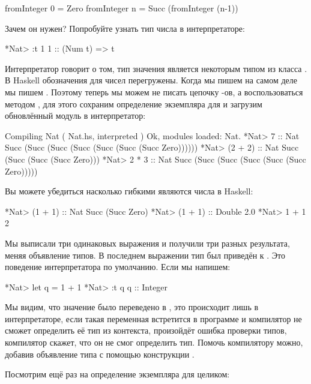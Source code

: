 \begin{code}
    fromInteger 0 = Zero
    fromInteger n = Succ (fromInteger (n-1))
\end{code}

Зачем он нужен? 
Попробуйте узнать тип числа  в интерпретаторе:

\begin{code}
*Nat> :t 1
1 :: (Num t) => t
\end{code}


Интерпретатор говорит о том, тип значения  является некоторым
типом из класса . В Haskell обозначения для чисел перегружены.
Когда мы пишем  на самом деле мы пишем .
Поэтому теперь мы можем не писать цепочку -ов, а воспользоваться 
методом , для этого сохраним определение экземпляра
для  и загрузим обновлённый модуль в интерпретатор: 

\begin{code}
[1 of 1] Compiling Nat              ( Nat.hs, interpreted )
Ok, modules loaded: Nat.
*Nat> 7 :: Nat
Succ (Succ (Succ (Succ (Succ (Succ (Succ Zero))))))
*Nat> (2 + 2) :: Nat
Succ (Succ (Succ (Succ Zero)))
*Nat> 2 * 3 :: Nat
Succ (Succ (Succ (Succ (Succ (Succ Zero)))))
\end{code}

Вы можете убедиться насколько гибкими являются числа в Haskell:

\begin{code}
*Nat> (1 + 1) :: Nat
Succ (Succ Zero)
*Nat> (1 + 1) :: Double
2.0
*Nat> 1 + 1
2
\end{code}


Мы выписали три одинаковых выражения и получили три разных 
результата, меняя объявление типов. В последнем выражении
тип был приведён к . Это поведение интерпретатора
по умолчанию. Если мы напишем:


\begin{code}
*Nat> let q = 1 + 1
*Nat> :t q
q :: Integer
\end{code}


Мы видим, что значение  было переведено в ,
это происходит лишь в интерпретаторе, если такая переменная
встретится в программе и компилятор не сможет определить 
её тип из контекста, произойдёт ошибка проверки типов, компилятор
скажет, что он не смог определить тип. Помочь компилятору 
можно, добавив объявление типа с помощью конструкции \mbox{}.

Посмотрим ещё раз на определение экземпляра  для 
целиком:

